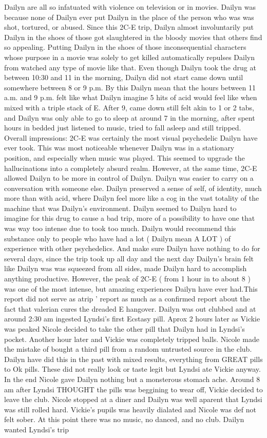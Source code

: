 \documentclass[12pt]{book}
\begin{document}
Dailyn are all so infatuated with violence on television or in movies. Dailyn was because none of Dailyn ever put Dailyn in the place of the person who was was shot, tortured, or abused. Since this 2C-E trip, Dailyn almost involuntarily put Dailyn in the shoes of those got slaughtered in the bloody movies that others find so appealing. Putting Dailyn in the shoes of those inconsequential characters whose purpose in a movie was solely to get killed automatically repulses Dailyn from watched any type of movie like that. Even though Dailyn took the drug at between 10:30 and 11 in the morning, Dailyn did not start came down until somewhere between 8 or 9 p.m. By this Dailyn mean that the hours between 11 a.m. and 9 p.m. felt like what Dailyn imagine 5 hits of acid would feel like when mixed with a triple stack of E. After 9, came down still felt akin to 1 or 2 tabs, and Dailyn was only able to go to sleep at around 7 in the morning, after spent hours in bedded just listened to music, tried to fall asleep and still tripped. Overall impressions: 2C-E was certainly the most visual psychedelic Dailyn have ever took. This was most noticeable whenever Dailyn was in a stationary position, and especially when music was played. This seemed to upgrade the hallucinations into a completely absurd realm. However, at the same time, 2C-E allowed Dailyn to be more in control of Dailyn. Dailyn was easier to carry on a conversation with someone else. Dailyn preserved a sense of self, of identity, much more than with acid, where Dailyn feel more like a cog in the vast totality of the machine that was Dailyn's environment. Dailyn seemed to Dailyn hard to imagine for this drug to cause a bad trip, more of a possibility to have one that was way too intense due to took too much. Dailyn would recommend this substance only to people who have had a lot ( Dailyn mean A LOT ) of experience with other psychedelics. And make sure Dailyn have nothing to do for several days, since the trip took up all day and the next day Dailyn's brain felt like Dailyn was was squeezed from all sides, made Dailyn hard to accomplish anything productive. However, the peak of 2C-E ( from 1 hour in to about 8 ) was one of the most intense, but amazing experiences Dailyn have ever had.This report did not serve as atrip ' report as much as a confirmed report about the fact that valerian cures the dreaded E hangover. Dailyn was out clubbed and at around 2:30 am ingested Lyndsi's first Ecstasy pill. Aprox 2 hours later as Vickie was peaked Nicole decided to take the other pill that Dailyn had in Lyndsi's pocket. Another hour later and Vickie was completely tripped balls. Nicole made the mistake of bought a third pill from a random untrusted source in the club. Dailyn have did this in the past with mixed results, everything from GREAT pills to Ok pills. These did not really look or taste legit but Lyndsi ate Vickie anyway. In the end Nicole gave Dailyn nothing but a monsterous stomach ache. Around 8 am after Lyndsi THOUGHT the pills was beggining to wear off, Vickie decided to leave the club. Nicole stopped at a diner and Dailyn was well aparent that Lyndsi was still rolled hard. Vickie's pupils was heavily dialated and Nicole was def not felt sober. At this point there was no music, no danced, and no club. Dailyn wanted Lyndsi's trip 
\end{document}
